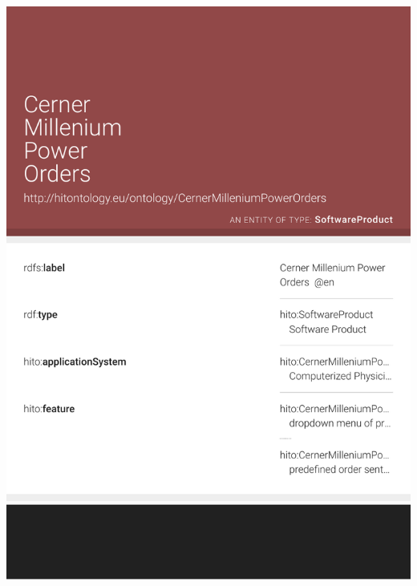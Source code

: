 \documentclass[aspectratio=1610]{beamer}%
\begin{document}
\begin{frame}[plain]
\begin{columns}
 \begin{column}{.55\textwidth}
  \centering\includegraphics[width=1.0\textwidth,height=1.0\textheight,keepaspectratio,trim=0 100 0 0,clip]{cernermillenium-lodview.pdf}
 \end{column}
\end{columns}
\end{frame}
\end{document}
